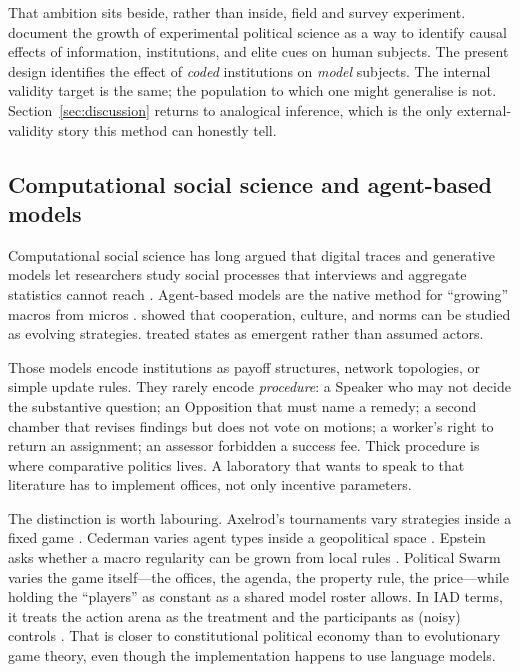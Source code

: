\documentclass[11pt,a4paper]{article}
\begin{document}
That ambition sits beside, rather than inside, field and survey experiment.
\citet{druckman2006,druckman2011} document the growth of experimental political science
as a way to identify causal effects of information, institutions, and elite cues on human
subjects. The present design identifies the effect of \emph{coded} institutions on
\emph{model} subjects. The internal validity target is the same; the population to which
one might generalise is not. Section~\ref{sec:discussion} returns to analogical
inference, which is the only external-validity story this method can honestly tell.

\subsection{Computational social science and agent-based models}

Computational social science has long argued that digital traces and generative models
let researchers study social processes that interviews and aggregate statistics cannot
reach \citep{lazer2009,salganik2018}. Agent-based models are the native method for
``growing'' macros from micros \citep{epstein1996,epstein1999}. \citet{axelrod1984,axelrod1997}
showed that cooperation, culture, and norms can be studied as evolving strategies.
\citet{cederman1997} treated states as emergent rather than assumed actors.

Those models encode institutions as payoff structures, network topologies, or simple
update rules. They rarely encode \emph{procedure}: a Speaker who may not decide the
substantive question; an Opposition that must name a remedy; a second chamber that
revises findings but does not vote on motions; a worker's right to return an assignment;
an assessor forbidden a success fee. Thick procedure is where comparative politics lives.
A laboratory that wants to speak to that literature has to implement offices, not only
incentive parameters.

The distinction is worth labouring. Axelrod's tournaments vary strategies inside a fixed
game \citep{axelrod1984}. Cederman varies agent types inside a geopolitical space
\citep{cederman1997}. Epstein asks whether a macro regularity can be grown from local
rules \citep{epstein1999}. Political Swarm varies the game itself---the offices, the
agenda, the property rule, the price---while holding the ``players'' as constant as a
shared model roster allows. In IAD terms, it treats the action arena as the treatment
and the participants as (noisy) controls \citep{ostrom2005}. That is closer to
constitutional political economy \citep{buchanan1962} than to evolutionary game theory,
even though the implementation happens to use language models.
\end{document}
